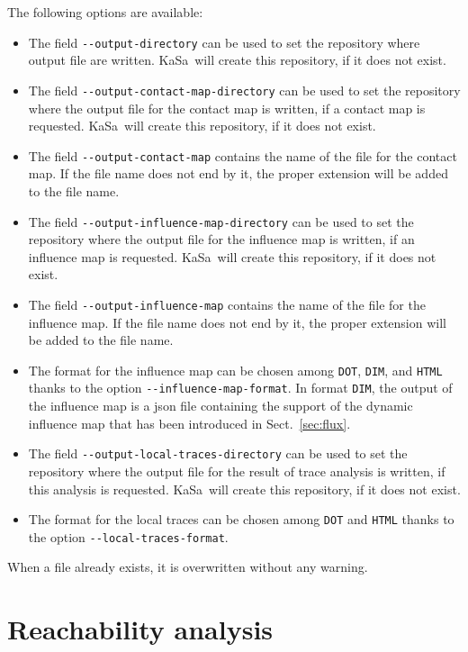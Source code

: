 \documentclass[11pt]{book}
\def\KaSa{\textsf{KaSa}}
\begin{document}
The following options are available:
\begin{itemize}
\item The field \texttt{-{}-output-directory} can be used to set the repository where output file are written. \KaSa~will create this repository, if it does not exist.
\item The field \texttt{-{}-output-contact-map-directory} can be used to set the repository where the output file for the contact map is written, if a contact map is requested. \KaSa~will create this repository, if it does not exist.
\item The field \texttt{-{}-output-contact-map} contains the name of the file for the contact map. If the file name does not end by it, the proper extension will be added to the file name.
\item The field \texttt{-{}-output-influence-map-directory} can be used to set the repository where the output file for the influence map is written, if an influence map is requested. \KaSa~will create this repository, if it does not exist.
\item The field \texttt{-{}-output-influence-map} contains the name of the file for the influence map. If the file name does not end by it, the proper extension will be added to the file name.
\item The format for the influence map can be chosen among \texttt{DOT}, \texttt{DIM}, and \texttt{HTML} thanks to the option \texttt{-{}-influence-map-format}. In format \texttt{DIM}, the output of the influence map is a json file containing the support of the dynamic influence map that has been introduced in Sect.~\ref{sec:flux}.
\item The field \texttt{-{}-output-local-traces-directory} can be used to set the repository where the output file for the result of trace analysis is written, if this analysis is requested. \KaSa~will create this repository, if it does not exist.
\item The format for the local traces can be chosen among \texttt{DOT} and \texttt{HTML} thanks to the option \texttt{-{}-local-traces-format}.


\end{itemize}

When a file already exists, it is overwritten without any warning.

\section{Reachability analysis}
\end{document}
